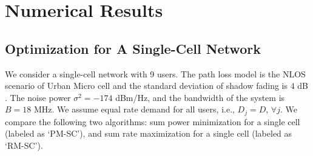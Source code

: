 \documentclass[journal]{IEEEtran}
\begin{document}
%
%

\section{Numerical Results}


\subsection{Optimization for A Single-Cell Network}
We consider a single-cell network with 9 users.
The path loss model is the NLOS scenario of Urban Micro cell and the standard deviation of shadow fading is $4$ dB \cite{access2010further}.
The noise power $\sigma^2=-174$ dBm/Hz, and the bandwidth of the system is $B=18$ MHz.
We assume equal rate demand for all users, i.e., $D_j=D$, $\forall j$.
We compare the following two algorithms: sum power minimization for a single cell (labeled as `PM-SC'), and sum rate maximization for a single cell (labeled as `RM-SC').
\end{document}

